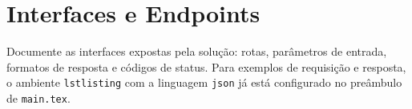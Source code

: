 \section{Interfaces e Endpoints}

Documente as interfaces expostas pela solução: rotas, parâmetros de entrada,
formatos de resposta e códigos de status. Para exemplos de requisição e
resposta, o ambiente \texttt{lstlisting} com a linguagem \texttt{json} já está
configurado no preâmbulo de \texttt{main.tex}.
